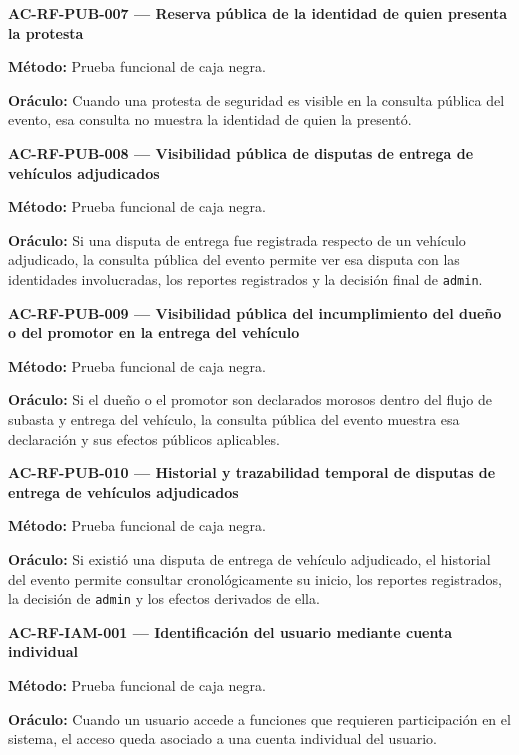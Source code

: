 \documentclass[10pt,letterpaper]{article}
\begin{document}
\noindent\textbf{AC-RF-PUB-007 --- Reserva pública de la identidad de quien presenta la protesta}\par
\textbf{Método:} Prueba funcional de caja negra.\par
\textbf{Oráculo:} Cuando una protesta de seguridad es visible en la consulta pública del evento, esa consulta no muestra la identidad de quien la presentó.\par\vspace{0.45em}
\noindent\textbf{AC-RF-PUB-008 --- Visibilidad pública de disputas de entrega de vehículos adjudicados}\par
\textbf{Método:} Prueba funcional de caja negra.\par
\textbf{Oráculo:} Si una disputa de entrega fue registrada respecto de un vehículo adjudicado, la consulta pública del evento permite ver esa disputa con las identidades involucradas, los reportes registrados y la decisión final de \texttt{admin}.\par\vspace{0.45em}
\noindent\textbf{AC-RF-PUB-009 --- Visibilidad pública del incumplimiento del dueño o del promotor en la entrega del vehículo}\par
\textbf{Método:} Prueba funcional de caja negra.\par
\textbf{Oráculo:} Si el dueño o el promotor son declarados morosos dentro del flujo de subasta y entrega del vehículo, la consulta pública del evento muestra esa declaración y sus efectos públicos aplicables.\par\vspace{0.45em}
\noindent\textbf{AC-RF-PUB-010 --- Historial y trazabilidad temporal de disputas de entrega de vehículos adjudicados}\par
\textbf{Método:} Prueba funcional de caja negra.\par
\textbf{Oráculo:} Si existió una disputa de entrega de vehículo adjudicado, el historial del evento permite consultar cronológicamente su inicio, los reportes registrados, la decisión de \texttt{admin} y los efectos derivados de ella.\par\vspace{0.45em}
\noindent\textbf{AC-RF-IAM-001 --- Identificación del usuario mediante cuenta individual}\par
\textbf{Método:} Prueba funcional de caja negra.\par
\textbf{Oráculo:} Cuando un usuario accede a funciones que requieren participación en el sistema, el acceso queda asociado a una cuenta individual del usuario.\par\vspace{0.45em}
\end{document}
